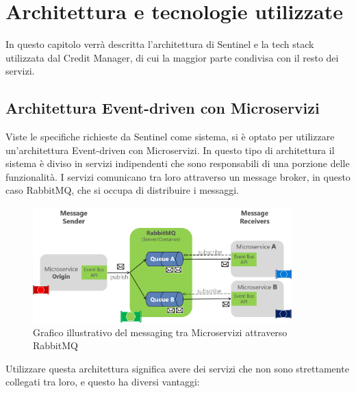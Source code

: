 \chapter{Architettura e tecnologie utilizzate}
In questo capitolo verr\`a descritta l'architettura di Sentinel e la tech stack utilizzata dal Credit Manager, di cui la maggior parte condivisa con il resto dei servizi.

\section{Architettura Event-driven con Microservizi}
Viste le specifiche richieste da Sentinel come sistema, si \`e optato per utilizzare un'architettura Event-driven con Microservizi.
In questo tipo di architettura il sistema \`e diviso in servizi indipendenti che sono responsabili di una porzione delle funzionalit\`a.
I servizi comunicano tra loro attraverso un message broker, in questo caso RabbitMQ, che si occupa di distribuire i messaggi.
\begin{figure}[H]
  \centering
  \includegraphics[width=10cm]{images/architecture-example.png}
  \caption{Grafico illustrativo del messaging tra Microservizi attraverso RabbitMQ\cite{microsoftrabbitmq}}
\end{figure}
Utilizzare questa architettura significa avere dei servizi che non sono strettamente collegati tra loro, e questo ha diversi vantaggi:
